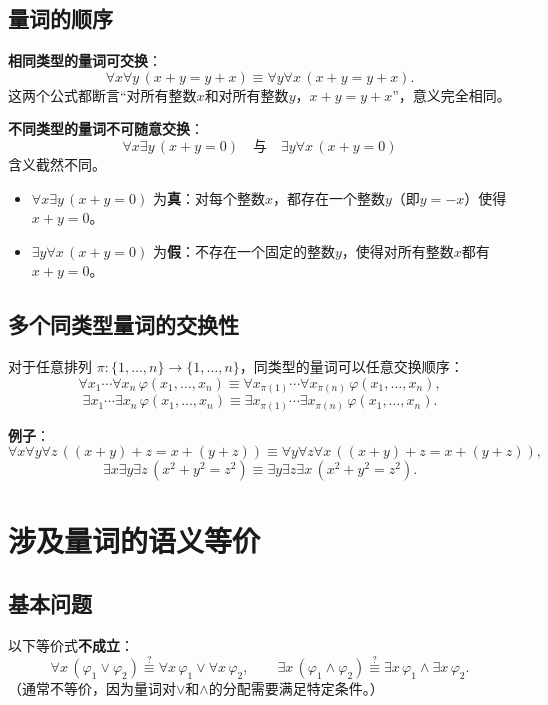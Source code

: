 \documentclass[UTF8,11pt,a4paper]{ctexbook}   %
\theoremstyle{definition}
\begin{document}
\subsection{量词的顺序}

\textbf{相同类型的量词可交换}：
\[
\forall x\forall y\,(x+y=y+x)\equiv\forall y\forall x\,(x+y=y+x).
\]
这两个公式都断言“对所有整数$x$和对所有整数$y$，$x+y=y+x$”，意义完全相同。

\textbf{不同类型的量词不可随意交换}：
\[
\forall x\exists y\,(x+y=0)\quad\text{与}\quad\exists y\forall x\,(x+y=0)
\]
含义截然不同。
\begin{itemize}
    \item $\forall x\exists y\,(x+y=0)$ 为\textbf{真}：对每个整数$x$，都存在一个整数$y$（即$y=-x$）使得$x+y=0$。
    \item $\exists y\forall x\,(x+y=0)$ 为\textbf{假}：不存在一个固定的整数$y$，使得对所有整数$x$都有$x+y=0$。
\end{itemize}

\subsection{\texorpdfstring{多个同类型量词的交换性}{多个同类型量词的交换性}}

对于任意排列 $\pi:\{1,\ldots,n\}\to\{1,\ldots,n\}$，同类型的量词可以任意交换顺序：
\[
\forall x_1\cdots\forall x_n\,\varphi(x_1,\ldots,x_n)\equiv\forall x_{\pi(1)}\cdots\forall x_{\pi(n)}\,\varphi(x_1,\ldots,x_n),
\]
\[
\exists x_1\cdots\exists x_n\,\varphi(x_1,\ldots,x_n)\equiv\exists x_{\pi(1)}\cdots\exists x_{\pi(n)}\,\varphi(x_1,\ldots,x_n).
\]

\textbf{例子}：
\[
\forall x\forall y\forall z\,((x+y)+z=x+(y+z))\equiv\forall y\forall z\forall x\,((x+y)+z=x+(y+z)),
\]
\[
\exists x\exists y\exists z\,(x^2+y^2=z^2)\equiv\exists y\exists z\exists x\,(x^2+y^2=z^2).
\]

\section{涉及量词的语义等价}

\subsection{基本问题}

以下等价式\textbf{不成立}：
\[
\forall x\,(\varphi_1\lor\varphi_2)\stackrel{?}{\equiv}\forall x\,\varphi_1\lor\forall x\,\varphi_2,\qquad
\exists x\,(\varphi_1\land\varphi_2)\stackrel{?}{\equiv}\exists x\,\varphi_1\land\exists x\,\varphi_2.
\]
（通常不等价，因为量词对$\lor$和$\land$的分配需要满足特定条件。）
\end{document}
